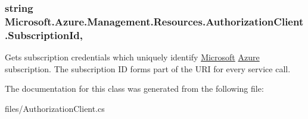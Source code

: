 \subsubsection[{\texorpdfstring{Subscription\+Id}{SubscriptionId}}]{\setlength{\rightskip}{0pt plus 5cm}string Microsoft.\+Azure.\+Management.\+Resources.\+Authorization\+Client.\+Subscription\+Id\hspace{0.3cm}{\ttfamily [get]}, {\ttfamily [set]}}\hypertarget{class_microsoft_1_1_azure_1_1_management_1_1_resources_1_1_authorization_client_a6b628c9f7628a01f07ad456c90515aa6}{}\label{class_microsoft_1_1_azure_1_1_management_1_1_resources_1_1_authorization_client_a6b628c9f7628a01f07ad456c90515aa6}


Gets subscription credentials which uniquely identify \hyperlink{namespace_microsoft}{Microsoft} \hyperlink{namespace_microsoft_1_1_azure}{Azure} subscription. The subscription ID forms part of the U\+RI for every service call. 



The documentation for this class was generated from the following file\+:\begin{DoxyCompactItemize}
\item 
files/Authorization\+Client.\+cs\end{DoxyCompactItemize}
